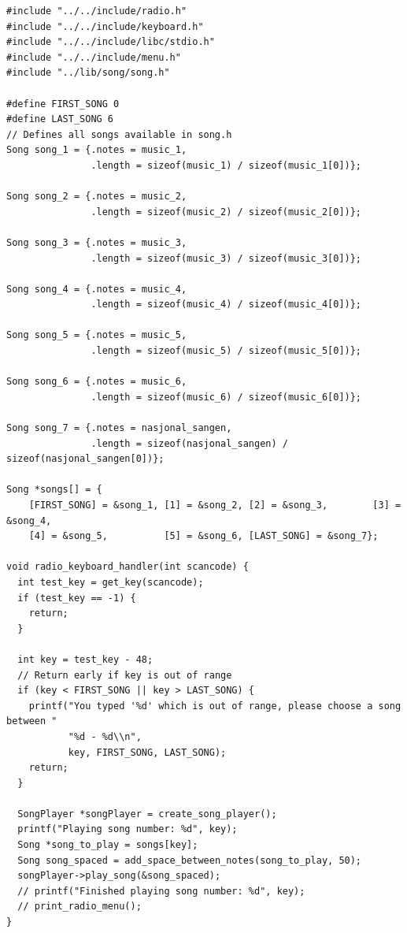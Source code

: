 \documentclass[../main.tex]{subfiles}
\begin{document}
\label{lst:radio_c}
\begin{verbatim}
#include "../../include/radio.h"
#include "../../include/keyboard.h"
#include "../../include/libc/stdio.h"
#include "../../include/menu.h"
#include "../lib/song/song.h"

#define FIRST_SONG 0
#define LAST_SONG 6
// Defines all songs available in song.h
Song song_1 = {.notes = music_1,
               .length = sizeof(music_1) / sizeof(music_1[0])};

Song song_2 = {.notes = music_2,
               .length = sizeof(music_2) / sizeof(music_2[0])};

Song song_3 = {.notes = music_3,
               .length = sizeof(music_3) / sizeof(music_3[0])};

Song song_4 = {.notes = music_4,
               .length = sizeof(music_4) / sizeof(music_4[0])};

Song song_5 = {.notes = music_5,
               .length = sizeof(music_5) / sizeof(music_5[0])};

Song song_6 = {.notes = music_6,
               .length = sizeof(music_6) / sizeof(music_6[0])};

Song song_7 = {.notes = nasjonal_sangen,
               .length = sizeof(nasjonal_sangen) / sizeof(nasjonal_sangen[0])};

Song *songs[] = {
    [FIRST_SONG] = &song_1, [1] = &song_2, [2] = &song_3,        [3] = &song_4,
    [4] = &song_5,          [5] = &song_6, [LAST_SONG] = &song_7};

void radio_keyboard_handler(int scancode) {
  int test_key = get_key(scancode);
  if (test_key == -1) {
    return;
  }

  int key = test_key - 48;
  // Return early if key is out of range
  if (key < FIRST_SONG || key > LAST_SONG) {
    printf("You typed '%d' which is out of range, please choose a song between "
           "%d - %d\\n",
           key, FIRST_SONG, LAST_SONG);
    return;
  }

  SongPlayer *songPlayer = create_song_player();
  printf("Playing song number: %d", key);
  Song *song_to_play = songs[key];
  Song song_spaced = add_space_between_notes(song_to_play, 50);
  songPlayer->play_song(&song_spaced);
  // printf("Finished playing song number: %d", key);
  // print_radio_menu();
}

\end{verbatim}
\end{document}
